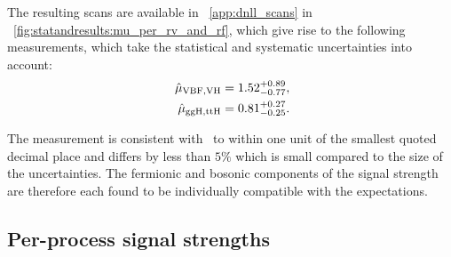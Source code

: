 The resulting scans are available in \App~\ref{app:dnll_scans} in \Fig~\ref{fig:statandresults:mu_per_rv_and_rf}, which give rise to the following measurements, which take the statistical and systematic uncertainties into account:
\begin{equation*}
\begin{split}
\,\hat{\mu}_{\text{VBF},\text{VH}} = 1.52^{+0.89}_{-0.77}, \\
\,\hat{\mu}_{\text{ggH},\text{ttH}} = 0.81^{+0.27}_{-0.25}.
\end{split}
\end{equation*}

The \muF measurement is consistent with~\cite{CMS-PAS-HIG-16-020} to within one unit of the smallest quoted decimal place and \muV differs by less than $5\%$ which is small compared to the size of the uncertainties. The fermionic and bosonic components of the signal strength are therefore each found to be individually compatible with the \SM expectations. %


\subsection{Per-process signal strengths}
\label{sec:statandresults:mu_per_proc}

